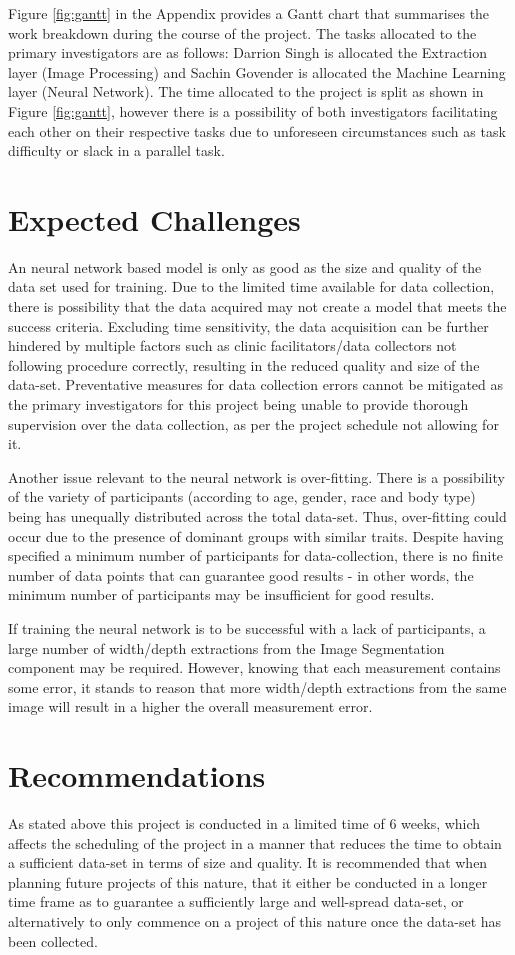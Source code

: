 Figure \ref{fig:gantt} in the Appendix provides a Gantt chart that summarises the work breakdown during the course of the project.
The tasks allocated to the primary investigators are as follows: Darrion Singh is allocated the Extraction layer (Image Processing) and Sachin Govender is allocated the Machine Learning layer (Neural Network).
The time allocated to the project is split as shown in Figure \ref{fig:gantt}, however there is a possibility of both investigators facilitating each other on their respective tasks due to unforeseen circumstances such as task difficulty or slack in a parallel task. 
\section{Expected Challenges}
An neural network based model is only as good as the size and quality of the data set used for training.
Due to the limited time available for data collection, there is possibility that the data acquired may not create a model that meets the success criteria.
Excluding time sensitivity, the data acquisition can be further hindered by multiple factors such as clinic facilitators/data collectors not following procedure correctly, resulting in the reduced quality and size of the data-set.
Preventative measures for data collection errors cannot be mitigated as the primary investigators for this project being unable to provide thorough supervision over the data collection, as per the project schedule not allowing for it.

Another issue relevant to the neural network is over-fitting. There is a possibility of the variety of participants (according to age, gender, race and body type) being has unequally distributed across the total data-set.
Thus, over-fitting could occur due to the presence of dominant groups with similar traits.
Despite having specified a minimum number of participants for data-collection, there is no finite number of data points that can guarantee good results - in other words, the minimum number of participants may be insufficient for good results.

If training the neural network is to be successful with a lack of participants, a large number of width/depth extractions from the Image Segmentation component may be required.
However, knowing that each measurement contains some error, it stands to reason that more width/depth extractions from the same image will result in a higher the overall measurement error.
\section{Recommendations}
As stated above this project is conducted in a limited time of 6 weeks, which affects the scheduling of the project in a manner that reduces the time to obtain a sufficient data-set in terms of size and quality.
It is recommended that when planning future projects of this nature, that it either be conducted in a longer time frame as to guarantee a sufficiently large and well-spread data-set, or alternatively to only commence on a project of this nature once the data-set has been collected.

